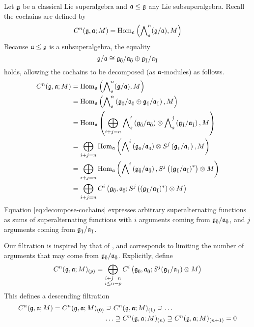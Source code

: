 Let $\mathfrak{g}$ be a classical Lie superalgebra and $\mathfrak{a} \leq \mathfrak{g}$ any Lie subsuperalgebra. Recall the cochains are defined by
\[
    C^n(\mathfrak{g},\mathfrak{a};M) = \operatorname{Hom}_{\mathfrak{a}} \left( \bigwedge\nolimits^{n}_s(\mathfrak{g}/\mathfrak{a}),M \right)
\]
Because $\mathfrak{a} \leq \mathfrak{g}$ is a subsuperalgebra, the equality
\[
  \mathfrak{g}/\mathfrak{a} \cong {\mathfrak{g}}_{\bar{0}} / {\mathfrak{a}}_{\bar{0}} \oplus {\mathfrak{g}}_{\bar{1}}/{\mathfrak{a}}_{\bar{1}}
\]
holds, allowing the cochains to be decomposed (as $\mathfrak{a}$-modules) as follows.
\begin{align} \begin{split} \label{eq:decompose-cochains}
  C^n(\mathfrak{g},\mathfrak{a};M)
  &= \operatorname{Hom}_{\mathfrak{a}} \left( \bigwedge\nolimits^{n}_s(\mathfrak{g}/\mathfrak{a}),M \right)\\
  &= \operatorname{Hom}_{\mathfrak{a}} \left( \bigwedge\nolimits^{n}_s\left({\mathfrak{g}}_{\bar{0}}/{\mathfrak{a}}_{\bar{0}} \oplus {\mathfrak{g}}_{\bar{1}}/{\mathfrak{a}}_{\bar{1}}\right),M \right)\\
  &= \operatorname{Hom}_{\mathfrak{a}} \left( \bigoplus_{i+j = n} \bigwedge\nolimits^{i}_s\left({\mathfrak{g}}_{\bar{0}}/{\mathfrak{a}}_{\bar{0}}\right) \otimes \bigwedge\nolimits^{j}_s\left({\mathfrak{g}}_{\bar{1}}/{\mathfrak{a}}_{\bar{1}}\right), M \right) \\
  &= \bigoplus_{i+j=n} \operatorname{Hom}_{\mathfrak{a}}\left( \bigwedge\nolimits^{i}\left({\mathfrak{g}}_{\bar{0}}/{\mathfrak{a}}_{\bar{0}}\right) \otimes S^j\left({\mathfrak{g}}_{\bar{1}}/{\mathfrak{a}}_{\bar{1}}\right), M  \right)\\
  &= \bigoplus_{i+j=n} \operatorname{Hom}_{\mathfrak{a}}\left( \bigwedge\nolimits^{i}\left({\mathfrak{g}}_{\bar{0}}/{\mathfrak{a}}_{\bar{0}}\right), S^{j}\left(\left({\mathfrak{g}}_{\bar{1}}/{\mathfrak{a}}_{\bar{1}}\right)^*\right) \otimes M  \right) \\
  &= \bigoplus_{i+j=n} C^i\left({\mathfrak{g}}_{\bar{0}},{\mathfrak{a}}_{\bar{0}}; S^j\left(({\mathfrak{g}}_{\bar{1}}/{\mathfrak{a}}_{\bar{1}})^*\right)\otimes M\right)
\end{split} \end{align}
Equation \ref{eq:decompose-cochains} expresses arbitrary superalternating functions as sums of superalternating functions with $i$ arguments coming from ${\mathfrak{g}}_{\bar{0}}/{\mathfrak{a}}_{\bar{0}}$, and $j$ arguments coming from ${\mathfrak{g}}_{\bar{1}}/{\mathfrak{a}}_{\bar{1}}$.

Our filtration is inspired by that of \cite{HS-53}, and corresponds to limiting the number of arguments that may come from ${\mathfrak{g}}_{\bar{0}}/{\mathfrak{a}}_{\bar{0}}$. Explicitly, define
\begin{equation}
  \label{eq:define-filtration}
  C^n(\g,\a;M)_{(p)} = \bigoplus_{\substack{i+j=n \\ i \leq n-p}} C^i\left(\even{\g},\even{\a}; S^j(\odd{\g}/\odd{\a})\otimes M\right)
\end{equation}
This defines a descending filtration
\begin{align}\begin{split}\label{eq:desc-filt}
    C^n(\mathfrak{g},\mathfrak{a};M) = C^n(\mathfrak{g},\mathfrak{a};M)_{(0)} &\supseteq  C^n(\mathfrak{g},\mathfrak{a};M)_{(1)} \supseteq \ldots \\
    &\ldots \supseteq C^n(\mathfrak{g},\mathfrak{a};M)_{(n)}  \supseteq C^n(\mathfrak{g},\mathfrak{a};M)_{(n+1)} = 0
 \end{split}
\end{align}

